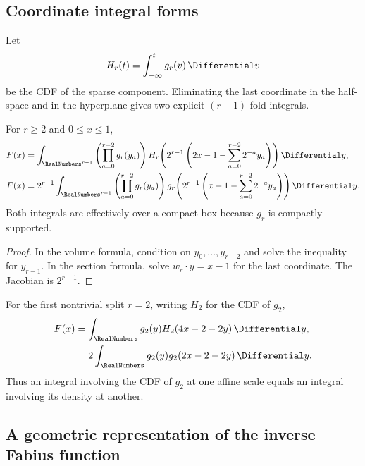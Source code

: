 \documentclass[11pt]{article}
\theoremstyle{definition}
\theoremstyle{remark}
\begin{document}
\subsection{Coordinate integral forms}

Let
\begin{equation}
 H_r(t)=\int_{-\infty}^{t}g_r(v)\,\Differential v                    \label{p5:eq:Hr-cdf}
\end{equation}
be the CDF of the sparse component.  Eliminating the last coordinate in the
half-space and in the hyperplane gives two explicit $(r-1)$-fold integrals.

\begin{corollary}
\label{p5:cor:coordinate-section}
For $r\ge2$ and $0\le x\le1$,
\begin{align}
 F(x)
 &=\int_{\RealNumbers^{r-1}}
   \left(\prod_{a=0}^{r-2}g_r(y_a)\right)
   H_r\!\left(2^{r-1}\left(2x-1-
      \sum_{a=0}^{r-2}2^{-a}y_a\right)\right)\Differential y,       \label{p5:eq:F-volume-coordinates}\\
 F(x)
 &=2^{r-1}\int_{\RealNumbers^{r-1}}
   \left(\prod_{a=0}^{r-2}g_r(y_a)\right)
   g_r\!\left(2^{r-1}\left(x-1-
      \sum_{a=0}^{r-2}2^{-a}y_a\right)\right)\Differential y.       \label{p5:eq:F-section-coordinates}
\end{align}
Both integrals are effectively over a compact box because $g_r$ is compactly
supported.
\end{corollary}

\begin{proof}
In the volume formula, condition on $y_0,\ldots,y_{r-2}$ and solve the inequality
for $y_{r-1}$.  In the section formula, solve
$w_r\cdot y=x-1$ for the last coordinate.  The Jacobian is $2^{r-1}$.
\end{proof}

For the first nontrivial split $r=2$, writing $H_2$ for the CDF of $g_2$,
\begin{align}
 F(x)
 &=\int_{\RealNumbers}g_2(y)H_2(4x-2-2y)\,\Differential y,                    \label{p5:eq:r2-volume}\\
 &=2\int_{\RealNumbers}g_2(y)g_2(2x-2-2y)\,\Differential y.                  \label{p5:eq:r2-section}
\end{align}
Thus an integral involving the CDF of $g_2$ at one affine scale equals an
integral involving its density at another.

\subsection{A geometric representation of the inverse Fabius function}
\end{document}
